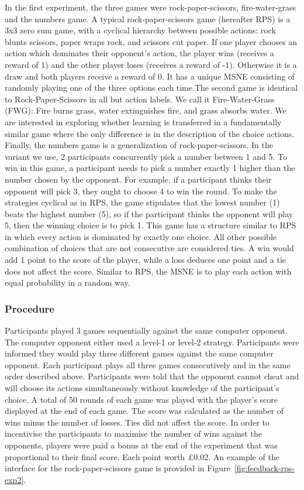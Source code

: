 \documentclass[man,floatsintext]{apa6}
\begin{document}
In the first experiment, the three games were rock-paper-scissors, fire-water-grass and the numbers game. A typical rock-paper-scissors game (hereafter RPS) is a 3x3 zero sum game, with a cyclical hierarchy between possible actions: rock blunts scissors, paper wraps rock, and scissors cut paper. If one player chooses an action which dominates their opponent's action, the player wins (receives a reward of 1) and the other player loses (receives a reward of -1). Otherwise it is a draw and both players receive a reward of 0. It has a unique MSNE consisting of randomly playing one of the three options each time.The second game is identical to Rock-Paper-Scissors in all but action labels. We call it Fire-Water-Grass (FWG): Fire burns grass, water extinguishes fire, and grass absorbs water. We are interested in exploring whether learning is transferred in a fundamentally similar game where the only difference is in the description of the choice actions. Finally, the numbers game is a generalization of rock-paper-scissors. In the variant we use, 2 participants concurrently pick a number between 1 and 5. To win in this game, a participant needs to pick a number exactly 1 higher than the number chosen by the opponent. For example, if a participant thinks their opponent will pick 3, they ought to choose 4 to win the round. To make the strategies cyclical as in RPS, the game stipulates that the lowest number (1) beats the highest number (5), so if the participant thinks the opponent will play 5, then the winning choice is to pick 1. This game has a structure similar to RPS in which every action is dominated by exactly one choice. All other possible combination of choices that are not consecutive are considered ties. A win would add 1 point to the score of the player, while a loss deduces one point and a tie does not affect the score. Similar to RPS, the MSNE is to play each action with equal probability in a random way.

\hypertarget{procedure}{%
\subsubsection{Procedure}\label{procedure}}

Participants played 3 games sequentially against the same computer opponent. The computer opponent either used a level-1 or level-2 strategy. Participants were informed they would play three different games against the same computer opponent. Each participant plays all three games consecutively and in the same order described above. Participants were told that the opponent cannot cheat and will choose its actions simultaneously without knowledge of the participant's choice. A total of 50 rounds of each game was played with the player's score displayed at the end of each game. The score was calculated as the number of wins minus the number of losses. Ties did not affect the score. In order to incentivise the participants to maximise the number of wins against the opponents, players were paid a bonus at the end of the experiment that was proportional to their final score. Each point worth £0.02. An example of the interface for the rock-paper-scissors game is provided in Figure~\ref{fig:feedback-rps-exp2}.
\end{document}
